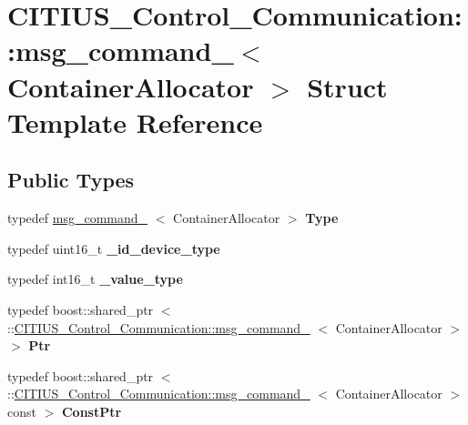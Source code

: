 \hypertarget{struct_c_i_t_i_u_s___control___communication_1_1msg__command__}{\section{\-C\-I\-T\-I\-U\-S\-\_\-\-Control\-\_\-\-Communication\-:\-:msg\-\_\-command\-\_\-$<$ \-Container\-Allocator $>$ \-Struct \-Template \-Reference}
\label{struct_c_i_t_i_u_s___control___communication_1_1msg__command__}
}
\subsection*{\-Public \-Types}
\begin{DoxyCompactItemize}
\item 
\hypertarget{struct_c_i_t_i_u_s___control___communication_1_1msg__command___ac7bbccd29918c8e0fedeca56270278c6}{typedef \hyperlink{struct_c_i_t_i_u_s___control___communication_1_1msg__command__}{msg\-\_\-command\-\_\-}\*
$<$ \-Container\-Allocator $>$ {\bfseries \-Type}}\label{struct_c_i_t_i_u_s___control___communication_1_1msg__command___ac7bbccd29918c8e0fedeca56270278c6}

\item 
\hypertarget{struct_c_i_t_i_u_s___control___communication_1_1msg__command___a2ee7068cb736b006cc749107879c6a48}{typedef uint16\-\_\-t {\bfseries \-\_\-id\-\_\-device\-\_\-type}}\label{struct_c_i_t_i_u_s___control___communication_1_1msg__command___a2ee7068cb736b006cc749107879c6a48}

\item 
\hypertarget{struct_c_i_t_i_u_s___control___communication_1_1msg__command___a73e41326250db0dfe652b57eb5ddccf2}{typedef int16\-\_\-t {\bfseries \-\_\-value\-\_\-type}}\label{struct_c_i_t_i_u_s___control___communication_1_1msg__command___a73e41326250db0dfe652b57eb5ddccf2}

\item 
\hypertarget{struct_c_i_t_i_u_s___control___communication_1_1msg__command___a35dab806b7252c961ae658ba6f8a45c7}{typedef boost\-::shared\-\_\-ptr\*
$<$ \-::\hyperlink{struct_c_i_t_i_u_s___control___communication_1_1msg__command__}{\-C\-I\-T\-I\-U\-S\-\_\-\-Control\-\_\-\-Communication\-::msg\-\_\-command\-\_\-}\*
$<$ \-Container\-Allocator $>$ $>$ {\bfseries \-Ptr}}\label{struct_c_i_t_i_u_s___control___communication_1_1msg__command___a35dab806b7252c961ae658ba6f8a45c7}

\item 
\hypertarget{struct_c_i_t_i_u_s___control___communication_1_1msg__command___a23f1f79e807c20cde81120a12a2822a1}{typedef boost\-::shared\-\_\-ptr\*
$<$ \-::\hyperlink{struct_c_i_t_i_u_s___control___communication_1_1msg__command__}{\-C\-I\-T\-I\-U\-S\-\_\-\-Control\-\_\-\-Communication\-::msg\-\_\-command\-\_\-}\*
$<$ \-Container\-Allocator $>$ const  $>$ {\bfseries \-Const\-Ptr}}\label{struct_c_i_t_i_u_s___control___communication_1_1msg__command___a23f1f79e807c20cde81120a12a2822a1}

\end{DoxyCompactItemize}
